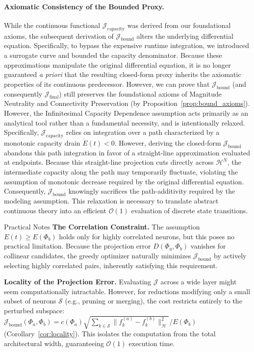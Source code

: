 \documentclass[11pt, a4paper, copyright, gdm]{google}
\newcommand{\normshort}[1]{\lVert#1\rVert}
\newcommand{\calH}{\mathcal{H}}
\newcommand{\calJ}{\mathcal{J}}
\newcommand{\calO}{\mathcal{O}}
\newcommand{\calS}{\mathcal{S}}
\theoremstyle{definition}
\begin{document}
\paragraph{Axiomatic Consistency of the Bounded Proxy.} While the continuous functional $\calJ_{\text{capacity}}$ was derived from our foundational axioms, the subsequent derivation of $\calJ_{\text{bound}}$ alters the underlying differential equation. Specifically, to bypass the expensive runtime integration, we introduced a surrogate curve and bounded the capacity denominator. Because these approximations manipulate the original differential equation, it is no longer guaranteed \textit{a priori} that the resulting closed-form proxy inherits the axiomatic properties of its continuous predecessor. However, we can prove that $\calJ_{\text{bound}}$ (and consequently $\calJ_{\text{final}}$) still  preserves the foundational axioms of Magnitude Neutrality and Connectivity Preservation (by Proposition~\ref{prop:bound_axioms}). However, the Infinitesimal Capacity Dependence assumption acts primarily as an analytical tool rather than a fundamental necessity, and is intentionally relaxed. Specifically, $\calJ_{\text{capacity}}$ relies on integration over a path characterized by a monotonic capacity drain $\dot{E}(t) < 0$. However, deriving the closed-form $\calJ_{\text{bound}}$ abandons this path integration in favor of a straight-line approximation evaluated at endpoints. Because this straight-line projection cuts directly across $\calH^N$, the intermediate capacity along the path may temporarily fluctuate, violating the assumption of monotonic decrease required by the original differential equation. Consequently, $\calJ_{\text{bound}}$ knowingly sacrifices the path-additivity required by the modeling assumption. This relaxation is necessary to translate abstract continuous theory into an efficient $\calO(1)$ evaluation of discrete state transitions.

\begin{insight}{Practical Notes}
\noindent \textbf{The Correlation Constraint.} The assumption $E(t) \geq E(\Phi_b)$ holds only for highly correlated neurons, but this poses no practical limitation. Because the projection error $D(\Phi_a, \Phi_b)$ vanishes for collinear candidates, the greedy optimizer naturally minimizes $\calJ_{\text{bound}}$ by actively selecting highly correlated pairs, inherently satisfying this requirement.

\vspace{0.15in}
\noindent \textbf{Locality of the Projection Error.} Evaluating $\calJ$ across a wide layer might seem computationally intractable. However, for reductions modifying only a small subset of neurons $\calS$ (e.g., pruning or merging), the cost restricts entirely to the perturbed subspace: $\calJ_{\text{bound}}(\Phi_a, \Phi_b) = c(\Phi_a) \sqrt{\sum_{k \in \calS} \normshort{f_k^{(a)} - f_k^{(b)}}_{\calH}^2}/E(\Phi_b)$ (Corollary~\ref{cor:locality}). This isolates the computation from the total architectural width, guaranteeing $\calO(1)$ execution time.
\end{insight}
\end{document}
